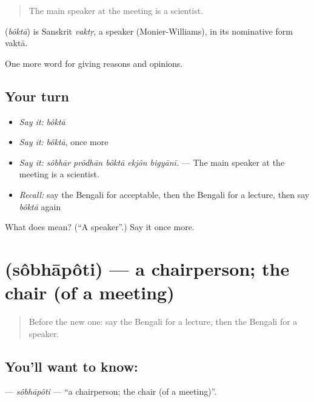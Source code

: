 \begin{quote}
The main speaker at the meeting is a scientist.
\end{quote}

\begin{cousinweb}
\textbf{} (\emph{bôktā}) is Sanskrit \emph{vaktṛ}, a speaker (Monier-Williams), in its nominative form vaktā.
\end{cousinweb}

\begin{grammarlens}[title={What you've built}]
One more word for giving reasons and opinions.
\end{grammarlens}

\subsection*{Your turn}
\begin{itemize}
\raggedright
  \item \emph{Say it:} \emph{bôktā}
  \item \emph{Say it:} \emph{bôktā}, once more
  \item \emph{Say it:} \emph{sôbhār prôdhān bôktā ekjôn bigyānī.} — The main speaker at the meeting is a scientist.
  \item \emph{Recall:} say the Bengali for acceptable, then the Bengali for a lecture, then say \emph{bôktā} again
\end{itemize}

\begin{tcolorbox}[breakable,colback=teal!4,colframe=teal!35!black,title={Before you move on}]
What does  mean? (\textquotedblleft{}A speaker\textquotedblright{}.) Say it once more.
\end{tcolorbox}
\section[\texorpdfstring{\bn{সভাপতি} (sôbhāpôti)}{সভাপতি (sôbhāpôti)}]{ (sôbhāpôti) — a chairperson; the chair (of a meeting)}

\label{lesson:BN-C360-sobhapoti}



\begin{quote}
Before the new one: say the Bengali for a lecture, then the Bengali for a speaker.
\end{quote}

\subsection*{You'll want to know: }
\textbf{} — \emph{sôbhāpôti} — \textquotedblleft{}a chairperson; the chair (of a meeting)\textquotedblright{}.

